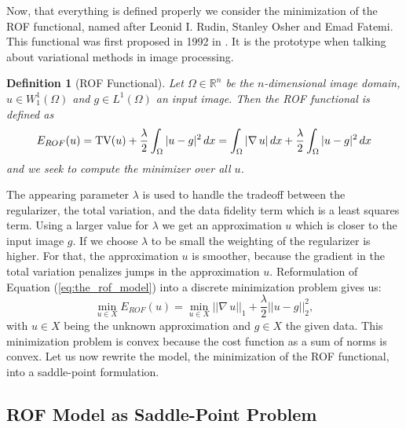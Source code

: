 \documentclass[abstracton]{scrreprt}
\newtheorem{definition}[theorem]{Definition}
\begin{document}
        Now, that everything is defined properly we consider the minimization of the ROF functional, named after Leonid I. Rudin, Stanley Osher and Emad Fatemi. This functional was first proposed in 1992 in \cite{ROF}. It is the prototype when talking about variational methods in image processing.
        \begin{definition}[ROF Functional] %
        \label{def:the_rof_functional}
            Let $\Omega \in \mathbb{R}^{n}$ be the $n$-dimensional image domain, $u \in W_{1}^{1}(\Omega)$ and $g \in L^{1}(\Omega)$ an input image. Then the ROF functional is defined as
                \begin{equation}
                    E_{ROF}(u) = \textnormal{TV}(u) + \frac{\lambda}{2} \int_{\Omega} |u - g|^{2} \, dx = \int_{\Omega} |\nabla \, u| \, dx + \frac{\lambda}{2} \int_{\Omega} |u - g|^{2} \, dx
                    \label{eq:the_rof_model}
                \end{equation}
            and we seek to compute the minimizer over all $u$.
        \end{definition}
        The appearing parameter $\lambda$ is used to handle the tradeoff between the regularizer, the total variation, and the data fidelity term which is a least squares term. Using a larger value for $\lambda$ we get an approximation $u$ which is closer to the input image $g$. If we choose $\lambda$ to be small the weighting of the regularizer is higher. For that, the approximation $u$ is smoother, because the gradient in the total variation penalizes jumps in the approximation $u$. Reformulation of Equation (\ref{eq:the_rof_model}) into a discrete minimization problem gives us:
            \begin{equation}
                \min_{u \in X} E_{ROF}(u) = \min_{u \in X} ||\nabla \, u||_{1} + \frac{\lambda}{2} ||u - g||_{2}^{2},
            \label{eq:discrete_rof_model}
            \end{equation}
        with $u \in X$ being the unknown approximation and $g \in X$ the given data. This minimization problem is convex because the cost function as a sum of norms is convex. Let us now rewrite the model, the minimization of the ROF functional, into a saddle-point formulation.

        \subsection{ROF Model as Saddle-Point Problem} %
        \label{sub:rof_model_as_saddle_point_problem}
\end{document}
